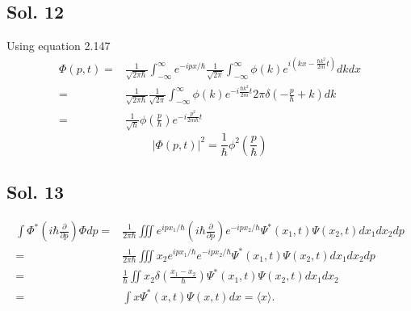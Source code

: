 \subsection*{Sol. 12}
Using equation 2.147
\begin{align*}
    \Phi(p,t)=&
    \frac{1}{\sqrt{2\pi\hbar}}
    \int_{-\infty}^{\infty}
    e^{-ipx/\hbar}
    \frac{1}{\sqrt{2\pi}}
    \int_{-\infty}^{\infty}
    \phi(k)
    e^{i(kx-\frac{\hbar k^2}{2m}t)}
    dk
    dx\\
    =&
    \frac{1}{\sqrt{2\pi\hbar}}
    \frac{1}{\sqrt{2\pi}}
    \int_{-\infty}^{\infty}
    \phi(k)e^{-i\frac{\hbar k^2}{2m}t}2\pi \delta(-\frac{p}{\hbar}+k)dk\\
    =& 
    \frac{1}{\sqrt{\hbar}}
    \phi\left(\frac{p}{\hbar}\right)e^{-i\frac{p^2}{2m\hbar}t}
\end{align*}
$$
|\Phi(p,t)|^2
=\frac{1}{\hbar}\phi^2\left(\frac{p}{\hbar}\right)
$$
\subsection*{Sol. 13}

\begin{align*}
    \int \Phi^*
    \left( i\hbar\frac{\partial}{\partial p}\right)
    \Phi dp = & 
    \frac{1}{2\pi\hbar}
    \iiint 
    e^{ipx_1/\hbar}
    \left( i\hbar\frac{\partial}{\partial p}\right)
    e^{-ipx_2/\hbar}
    \Psi^*(x_1,t)
    \Psi(x_2,t)
    dx_1dx_2dp\\
    =& 
    \frac{1}{2\pi\hbar}
    \iiint 
    x_2
    e^{ipx_1/\hbar}
    e^{-ipx_2/\hbar}
    \Psi^*(x_1,t)
    \Psi(x_2,t)
    dx_1dx_2dp\\
    =&
    \frac{1}{\hbar}\iint 
    x_2
    \delta(\frac{x_1-x_2}{\hbar})
    \Psi^*(x_1,t)
    \Psi(x_2,t)
    dx_1dx_2\\
    =&
    \int x \Psi^*(x,t)\Psi(x,t)dx = \langle x\rangle.
\end{align*}
